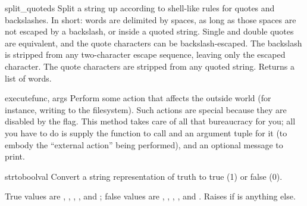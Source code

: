 \documentclass{manual}
\begin{document}
\begin{funcdesc}{split_quoted}{s}
Split a string up according to \UNIX{} shell-like rules for quotes and
backslashes.  In short: words are delimited by spaces, as long as those
spaces are not escaped by a backslash, or inside a quoted string.
Single and double quotes are equivalent, and the quote characters can
be backslash-escaped.  The backslash is stripped from any two-character
escape sequence, leaving only the escaped character.  The quote
characters are stripped from any quoted string.  Returns a list of
words.
\end{funcdesc}

\begin{funcdesc}{execute}{func, args}
Perform some action that affects the outside world (for instance,
writing to the filesystem).  Such actions are special because they
are disabled by the  flag.  This method takes 
care of all that bureaucracy for you; all you have to do is supply the
function to call and an argument tuple for it (to embody the
``external action'' being performed), and an optional message to
print.
\end{funcdesc}

\begin{funcdesc}{strtobool}{val}
Convert a string representation of truth to true (1) or false (0).

True values are , , , ,  
and ; false values are , , , , 
 and .  Raises  if  
is anything else.
\end{funcdesc}
\end{document}
